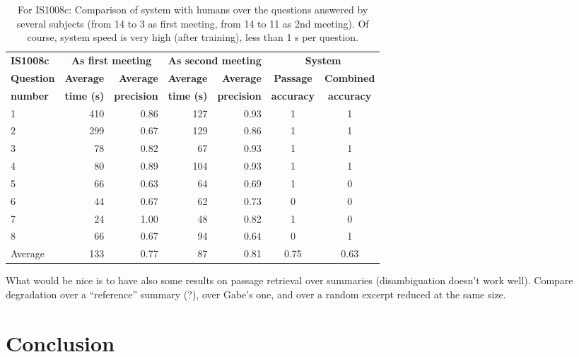 \documentclass[11pt]{article}
\begin{document}
\begin{table*}
\begin{center}
\begin{tabular}{|l|rr|rr||cc|}
\hline
\textbf{IS1008c} & \multicolumn{2}{c|}{\textbf{As first meeting}} & \multicolumn{2}{c||}{\bf As second meeting} & \multicolumn{2}{c|}{\textbf{System}} 	 \\
\bf Question 	&\bf Average 	&\bf Average 		&\bf Average 	&\bf Average 		&\bf Passage &\bf Combined \\ 
\bf number 		&\bf time (s)	&\bf precision	&\bf time (s)	&\bf precision 	&\bf accuracy &\bf accuracy \\ 
\hline
1 						& 410 				& 0.86					& 127					& 0.93					& 1 & 1 \\
2 						& 299 				& 0.67					& 129					& 0.86					& 1 & 1 \\
3 						& 78  				& 0.82					& 67					& 0.93					& 1 & 1 \\
4 						& 80  				& 0.89					& 104					& 0.93					& 1 & 1 \\
5 						& 66  				& 0.63					& 64					& 0.69					& 1 & 0 \\
6 						& 44  				& 0.67					& 62					& 0.73					& 0 & 0 \\
7 						& 24  				& 1.00					& 48					& 0.82					& 1 & 0 \\
8 						& 66  				& 0.67					& 94					& 0.64					& 0 & 1 \\
\hline
Average				& 133 				& 0.77					& 87					& 0.81					& 0.75 & 0.63 \\
\hline
\end{tabular}
\end{center}
\caption{\label{tab:autobet-vs-humans-is} For IS1008c: Comparison of system with humans over the questions answered by several subjects (from 14 to 3 as first meeting, from 14 to 11 as 2nd meeting).  Of course, system speed is very high (after training), less than 1 s per question.}
\end{table*}

What would be nice is to have also some results on passage retrieval over summaries (disambiguation doesn't work well).  Compare degradation over a ``reference'' summary (?), over Gabe's one, and over a random excerpt reduced at the same size.

\section{Conclusion}
\label{sec:conclusion}
\end{document}
